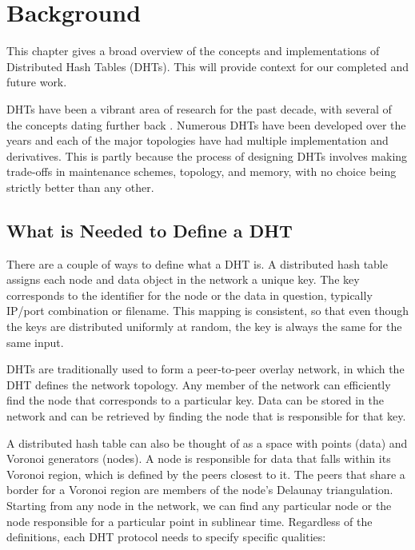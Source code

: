 \chapter{Background}
\label{chapter:background}
This chapter gives a broad overview of the concepts and implementations of Distributed Hash Tables (DHTs).
This will provide context for our completed and future work.

DHTs have been a vibrant area of research for the past decade, with several of the concepts dating further back \cite{bittorrent} \cite{kademlia}  \cite{can} \cite{ratnasamy2002ght} \cite{prr} \cite{chord} \cite{pastry}.
Numerous DHTs have been developed over the years and each of the major topologies have had multiple implementation and derivatives.
This is partly because the process of designing DHTs involves making trade-offs in maintenance schemes, topology, and memory, with no choice being strictly better than any other.





\section{What is Needed to Define a DHT}
There are a couple of ways to define what a DHT is.
A distributed hash table assigns each node and data object in the network a unique key.
The key corresponds to the identifier for the node or the data in question, typically IP/port combination or filename.
This mapping is consistent, so that even though the keys are distributed uniformly at random, the key is always the same for the same input.

DHTs are traditionally used to form a peer-to-peer overlay network, in which the DHT defines the network topology.
Any member of the network can efficiently find the node that corresponds to a particular key.
Data can be stored in the network and can be retrieved by finding the node that is responsible for that key.

A distributed hash table can also be thought of as a space with points (data) and Voronoi generators (nodes).
A node is responsible for data that falls within its Voronoi region, which is defined by the peers closest to it.
The peers that share a border for a Voronoi region are members of the node's Delaunay triangulation.
Starting from any node in the network, we can find any particular node or the node responsible for a particular point in sublinear time.
Regardless of the definitions, each DHT protocol needs to specify specific qualities:

